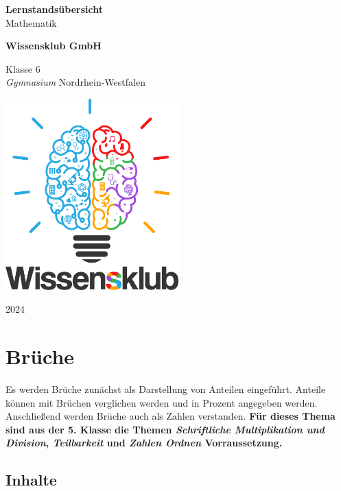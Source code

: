 \documentclass{article}
\begin{document}
\begin{titlepage}
    \begin{center}
        \vspace*{1cm}
            
        \Huge
        \textbf{Lernstandsübersicht}\\            
        \vspace{0.5cm}
        \LARGE
        Mathematik
            
        \vspace{1.5cm}
            
        \textbf{Wissensklub GmbH}
            
        \vfill
            
        Klasse 6\\
        \textit{Gymnasium} Nordrhein-Westfalen
            
        \vspace{0.8cm}
            
        \includegraphics[width=0.5\textwidth]{Wissensklub-Logo.png}
            
        \Large
        2024          
    \end{center}
\end{titlepage}
\section{Brüche}
Es werden Brüche zunächst als Darstellung von Anteilen eingeführt.
Anteile können mit Brüchen verglichen werden und in Prozent angegeben werden.
Anschließend werden Brüche auch als Zahlen verstanden. 
\textbf{Für dieses Thema sind aus der 5. Klasse die Themen \textit{Schriftliche Multiplikation und Division}, \textit{Teilbarkeit} und \textit{Zahlen Ordnen} Vorraussetzung.}
\subsection{Inhalte}
\end{document}
